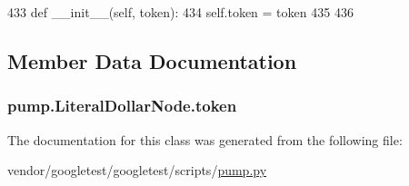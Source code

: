\begin{DoxyCode}
433   \textcolor{keyword}{def }\_\_init\_\_(self, token):
434     self.token = token
435 
436 
\end{DoxyCode}


\subsection{Member Data Documentation}
\subsubsection[{\texorpdfstring{token}{token}}]{\setlength{\rightskip}{0pt plus 5cm}pump.\+Literal\+Dollar\+Node.\+token}\hypertarget{classpump_1_1LiteralDollarNode_ab4c6e209635b8868bcdf0fe8053431c6}{}\label{classpump_1_1LiteralDollarNode_ab4c6e209635b8868bcdf0fe8053431c6}


The documentation for this class was generated from the following file\+:\begin{DoxyCompactItemize}
\item 
vendor/googletest/googletest/scripts/\hyperlink{pump_8py}{pump.\+py}\end{DoxyCompactItemize}
